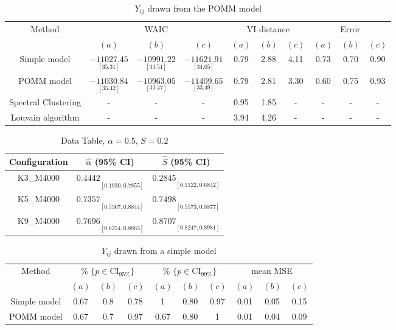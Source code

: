 \documentclass[11pt]{amsart}
\begin{document}
\begin{table}[htbp]
\centering
\caption{$Y_{ij}$ drawn from the POMM model}
\begin{tabular}{cccccccccc}
\toprule
\multirow{2}{*}{Method} & \multicolumn{3}{c}{WAIC} & \multicolumn{3}{c}{VI distance} & \multicolumn{3}{c}{Error} \\
\cmidrule(lr){2-4} \cmidrule(lr){5-7} \cmidrule(lr){8-10}
& $(a)$ & $(b)$ & $(c)$ & $(a)$ & $(b)$ & $(c)$ & $(a)$ & $(b)$ & $(c)$ \\
\midrule
Simple model &  $\underset{[35.31]}{-11027.45}$ & $\underset{[33.51]}{-10991.22}$ & $\underset{[34.05]}{-11621.91}$ & 0.79 & 2.88 & 4.11 & 0.73 & 0.70 & 0.90 \\
POMM model & $\underset{[35.42]}{-11030.84}$ & $\underset{[33.47]}{-10963.05}$& $\underset{[33.49]}{-11409.65}$ & 0.79 & 2.81 & 3.30 & 0.60 & 0.75 & 0.93\\
Spectral Clustering & - & - & - & 0.95 & 1.85 & - & - & - & - \\
Louvain algorithm & - & - & - & 3.94 & 4.26 & - & - & - & - \\
\bottomrule
\end{tabular}
\end{table}




\begin{table}[htbp]
  \centering
  \caption{Data Table, $\alpha=0.5$, $S=0.2$}
  \label{tab:data}
  \begin{tabular}{ccc}
    \toprule
    Configuration & $\hat{\alpha}$ (95\% CI) & $\hat{S}$ (95\% CI)  \\
    \midrule
    K3\_M4000 & $0.4442 \underset{[0.1930, 0.7855]}{}$ & $0.2845 \underset{[0.1122, 0.6842]}{}$ \\
    K5\_M4000 & $0.7357 \underset{[0.5367, 0.8844]}{}$ & $0.7498 \underset{[0.5573, 0.8877]}{}$ \\
    K9\_M4000 & $0.7696 \underset{[0.6254, 0.8865]}{}$ & $0.8707 \underset{[0.8247, 0.8981]}{}$ \\
    \bottomrule
  \end{tabular}
\end{table}





\begin{table}[htbp]
\centering
\caption{$Y_{ij}$ drawn from a simple model}
\begin{tabular}{cccccccccc}
\toprule
\multirow{2}{*}{Method} & \multicolumn{3}{c}{
\% $\{p \in \text{CI}_{95\%}\}$} & \multicolumn{3}{c}{
\% $\{p \in \text{CI}_{99\%}\}$} & \multicolumn{3}{c}{mean MSE} \\
\cmidrule(lr){2-4} \cmidrule(lr){5-7} \cmidrule(lr){8-10}
& $(a)$ & $(b)$ & $(c)$ & $(a)$ & $(b)$ & $(c)$ & $(a)$ & $(b)$ & $(c)$ \\
\midrule
Simple model & 0.67 &  0.8 & 0.78 & 1&0.80 & 0.97 & 0.01 & 0.05 & 0.15 \\
POMM model  &0.67&  0.7 & 0.97 & 0.67 & 0.80  & 1 & 0.01 & 0.04 & 0.09  \\
\bottomrule
\end{tabular}
\label{table:simulations_from_simple}
\end{table}
\end{document}
